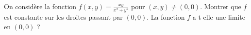 \begin{exercice}[\minsyndical]\label{exoLimiteContinue0001}

On considère la fonction $f(x,y) = \frac{xy}{x^2+y^2}$ pour $(x,y)\not=(0,0)$. Montrer que $f$ est constante sur les droites passant par $(0,0)$. La fonction $f$ a-t-elle une limite en $(0,0)$ ?

\end{exercice}
